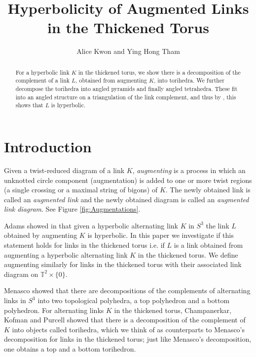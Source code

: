 \documentclass[11pt]{amsart}
\title{Hyperbolicity of Augmented Links in the Thickened Torus}
\author[Alice Kwon and Ying Hong Tham]{Alice Kwon and Ying Hong Tham}
\newcommand{\comment}[1]{}
\newcommand{\Sp}{{S}}
\newcommand{\torus}{{\mathbb{T}^2}}
\theoremstyle{plain}
\theoremstyle{definition}
\begin{document}
\maketitle




\begin{abstract}
For a hyperbolic link $K$ in the thickened torus,
we show there is a decomposition of the complement of a link $L$,
obtained from augmenting $K$, into torihedra. We further decompose 
the torihedra into angled pyramids and finally angled tetrahedra.
These fit into an angled structure on a triangulation of the link complement,
and thus by \cite{Casson-Rivin}, this shows
that $L$ is hyperbolic.  
\end{abstract}


\section{Introduction}
\label{s:intro}

Given a twist-reduced diagram of a link $K$, \emph{augmenting} is a process in
which an unknotted circle component (augmentation) is added to one or more twist
regions (a single crossing or a maximal string of bigons) of $K$.
The newly obtained link is called an 
\emph{augmented link} and the newly obtained diagram is called an 
\emph{augmented link diagram}. See Figure
\ref{fig:Augmentations}. 


Adams showed in \cite{CA} that given a hyperbolic alternating link $K$ in
$\Sp^3$ the link $L$ obtained by augmenting $K$ is hyperbolic. In this paper we
investigate if this statement holds for links in the thickened torus i.e. if $L$
is a link obtained from augmenting a hyperbolic alternating link $K$ in the
thickened torus. We define augmenting similarly for links in the thickened torus
with their associated link diagram on $\torus \times \{0\}.$ 


Menasco \cite{Menasco} showed that there are decompositions
of the complements of alternating links in $\Sp^3$
into two topological polyhedra,
a top polyhedron and a bottom polyhedron.
For alternating links $K$ in the thickened torus,
Champanerkar, Kofman and Purcell \cite{CKP2}
showed that there is a decomposition of the
complement of $K$ into objects called torihedra, which we think of as
counterparts to Menasco's decomposition %
for links in the thickened torus;
just like Menasco's decomposition, one obtains a top and a bottom torihedron.
\end{document}
